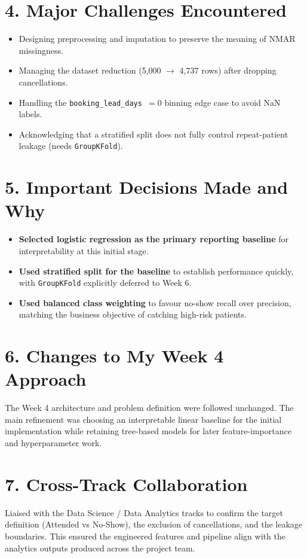 \documentclass[11pt,a4paper]{article}
\begin{document}
\section*{4. Major Challenges Encountered}
\begin{itemize}
    \item Designing preprocessing and imputation to preserve the meaning of NMAR missingness.
    \item Managing the dataset reduction (5,000 $\to$ 4,737 rows) after dropping cancellations.
    \item Handling the \texttt{booking\_lead\_days $= 0$} binning edge case to avoid NaN labels.
    \item Acknowledging that a stratified split does not fully control repeat-patient leakage
          (needs \texttt{GroupKFold}).
\end{itemize}

\section*{5. Important Decisions Made and Why}
\begin{itemize}
    \item \textbf{Selected logistic regression as the primary reporting baseline} for
          interpretability at this initial stage.
    \item \textbf{Used stratified split for the baseline} to establish performance quickly, with
          \texttt{GroupKFold} explicitly deferred to Week 6.
    \item \textbf{Used balanced class weighting} to favour no-show recall over precision, matching
          the business objective of catching high-risk patients.
\end{itemize}

\section*{6. Changes to My Week 4 Approach}
The Week 4 architecture and problem definition were followed unchanged. The main refinement was
choosing an interpretable linear baseline for the initial implementation while retaining tree-based
models for later feature-importance and hyperparameter work.

\section*{7. Cross-Track Collaboration}
Liaised with the Data Science / Data Analytics tracks to confirm the target definition (Attended vs
No-Show), the exclusion of cancellations, and the leakage boundaries. This ensured the engineered
features and pipeline align with the analytics outputs produced across the project team.
\end{document}
